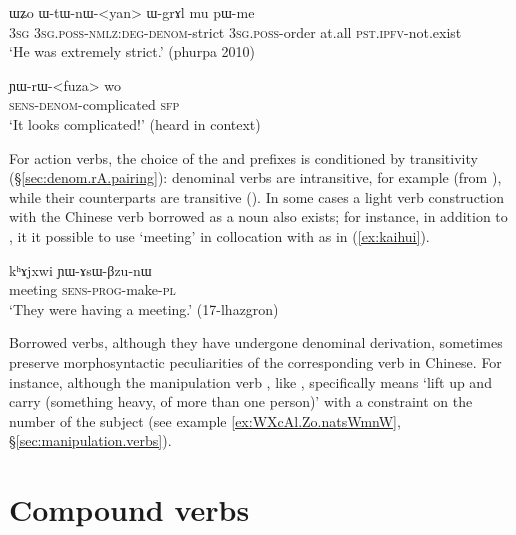 \begin{exe}
\ex \label{ex:WtWnWyan}
\gll ɯʑo ɯ-tɯ-nɯ-<yan> ɯ-grɤl mu pɯ-me \\
\textsc{3sg} \textsc{3sg}.\textsc{poss}-\textsc{nmlz}:\textsc{deg}-\textsc{denom}-strict \textsc{3sg}.\textsc{poss}-order at.all \textsc{pst}.\textsc{ipfv}-not.exist \\
\glt `He was extremely strict.' (phurpa 2010)
\end{exe}

\begin{exe}
\ex \label{ex:YWrWfuza}
\gll  ɲɯ-rɯ-<fuza> wo \\
\textsc{sens}-\textsc{denom}-complicated \textsc{sfp} \\
\glt `It looks complicated!' (heard in context)
\end{exe}

For action verbs, the choice of the  and  prefixes is conditioned by transitivity (§\ref{sec:denom.rA.pairing}):  denominal verbs are intransitive, for example  (from ), while their  counterparts are transitive (). In some cases a light verb construction with the Chinese verb borrowed as a noun also exists; for instance, in addition to , it it possible to use  `meeting' in collocation with  as in (\ref{ex:kaihui}). 

\begin{exe}
\ex \label{ex:kaihui}
\gll kʰɤjxwi ɲɯ-ɤsɯ-βzu-nɯ \\
meeting \textsc{sens}-\textsc{prog}-make-\textsc{pl} \\
\glt `They were having a meeting.' (17-lhazgron)
\end{exe}


Borrowed verbs, although they have undergone denominal derivation, sometimes preserve morphosyntactic peculiarities of the corresponding verb in Chinese. For instance, although the manipulation verb , like , specifically means `lift up and carry (something heavy, of more than one person)' with a constraint on the number of the subject (see example \ref{ex:WXcAl.Zo.natsWmnW}, §\ref{sec:manipulation.verbs}).

\section{Compound verbs} \label{sec:denom.compound.verbs}

